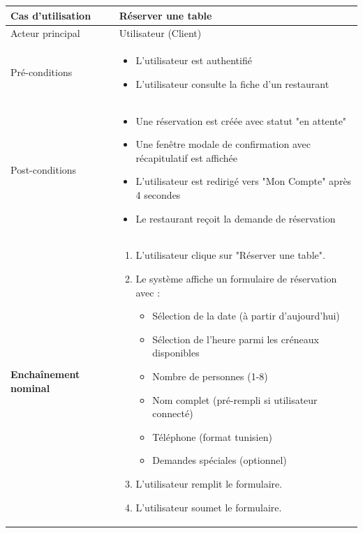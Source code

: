 \renewcommand{\arraystretch}{1.8}
\setlength{\extrarowheight}{6pt}
\begin{longtable}{|p{6cm}|p{10cm}|}
\hline
\rule{0pt}{12pt} Cas d'utilisation & \rule{0pt}{12pt} Réserver une table \\ 
\hline
\rule{0pt}{12pt} Acteur principal & \rule{0pt}{12pt} Utilisateur (Client) \\ 
\hline
\rule{0pt}{12pt} Pré-conditions & \rule{0pt}{12pt} 
\begin{itemize}
\setlength{\itemsep}{2pt}
\item L'utilisateur est authentifié
\item L'utilisateur consulte la fiche d'un restaurant
\end{itemize} \\ 
\hline
\rule{0pt}{12pt} Post-conditions & \rule{0pt}{12pt} 
\begin{itemize}
\setlength{\itemsep}{2pt}
\item Une réservation est créée avec statut "en attente"
\item Une fenêtre modale de confirmation avec récapitulatif est affichée
\item L'utilisateur est redirigé vers "Mon Compte" après 4 secondes
\item Le restaurant reçoit la demande de réservation
\end{itemize} \\ 
\hline
\rule{0pt}{12pt} \textbf{Enchaînement nominal} & \rule{0pt}{10pt}
\begin{enumerate}
\setlength{\itemsep}{2pt}
\item L'utilisateur clique sur "Réserver une table".
\item Le système affiche un formulaire de réservation avec :
  \begin{itemize}
  \item Sélection de la date (à partir d'aujourd'hui)
  \item Sélection de l'heure parmi les créneaux disponibles
  \item Nombre de personnes (1-8)
  \item Nom complet (pré-rempli si utilisateur connecté)
  \item Téléphone (format tunisien)
  \item Demandes spéciales (optionnel)
  \end{itemize}
\item L'utilisateur remplit le formulaire.
\item L'utilisateur soumet le formulaire.

\end{enumerate}
\end{longtable}
